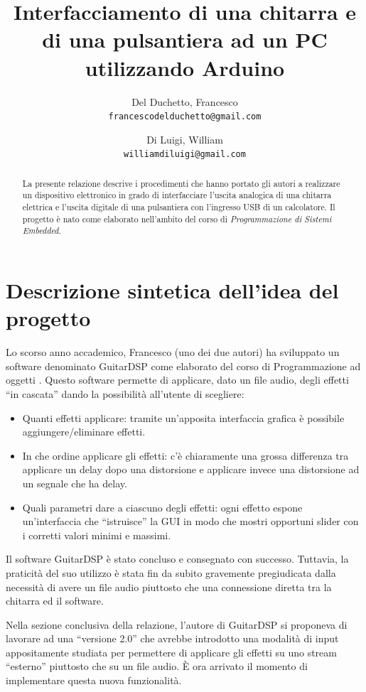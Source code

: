 \documentclass[a4paper,11pt]{article}
\title{Interfacciamento di una chitarra e di una pulsantiera ad un PC utilizzando Arduino}
\author{
	Del Duchetto, Francesco\\
	\texttt{francescodelduchetto@gmail.com}
	\and
	Di Luigi, William\\
	\texttt{williamdiluigi@gmail.com}
}
\begin{document}
\maketitle

\begin{abstract}
	La presente relazione descrive i procedimenti che hanno portato gli autori a realizzare un dispositivo elettronico in grado di interfacciare l'uscita analogica di una chitarra elettrica e l'uscita digitale di una pulsantiera con l'ingresso USB di un calcolatore. Il progetto è nato come elaborato nell'ambito del corso di \emph{Programmazione di Sistemi Embedded}.
\end{abstract}

\section{Descrizione sintetica dell'idea del progetto}

Lo scorso anno accademico, Francesco (uno dei due autori) ha sviluppato un software denominato GuitarDSP come elaborato del corso di Programmazione ad oggetti \cite{delduchetto2014}. Questo software permette di applicare, dato un file audio, degli effetti ``in cascata'' dando la possibilità all'utente di scegliere:
\begin{itemize}
\item Quanti effetti applicare: tramite un'apposita interfaccia grafica è possibile aggiungere/eliminare effetti.
\item In che ordine applicare gli effetti: c'è chiaramente una grossa differenza tra applicare un delay dopo una distorsione e applicare invece una distorsione ad un segnale che ha delay.
\item Quali parametri dare a ciascuno degli effetti: ogni effetto espone un'interfaccia che ``istruisce'' la GUI in modo che mostri opportuni slider con i corretti valori minimi e massimi.
\end{itemize}

Il software GuitarDSP è stato concluso e consegnato con successo. Tuttavia, la praticità del suo utilizzo è stata fin da subito gravemente pregiudicata dalla necessità di avere un file audio piuttosto che una connessione diretta tra la chitarra ed il software.

Nella sezione conclusiva della relazione, l'autore di GuitarDSP si proponeva di lavorare ad una ``versione 2.0'' che avrebbe introdotto una modalità di input appositamente studiata per permettere di applicare gli effetti su uno stream ``esterno'' piuttosto che su un file audio. È ora arrivato il momento di implementare questa nuova funzionalità.
\end{document}
